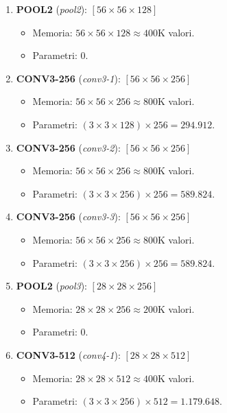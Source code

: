 ﻿\documentclass[11pt, a4paper]{article}
\begin{document}
\begin{enumerate}[noitemsep]
\begin{itemize}
    \end{itemize}
    \item \textbf{POOL2} (\emph{pool2}): $[56 \times 56 \times 128]$
    \begin{itemize}
        \item Memoria: $56 \times 56 \times 128 \approx 400\text{K}$ valori.
        \item Parametri: $0$.
    \end{itemize}
    \item \textbf{CONV3-256} (\emph{conv3-1}): $[56 \times 56 \times 256]$
    \begin{itemize}
        \item Memoria: $56 \times 56 \times 256 \approx 800\text{K}$ valori.
        \item Parametri: $(3 \times 3 \times 128) \times 256 = 294.912$.
    \end{itemize}
    \item \textbf{CONV3-256} (\emph{conv3-2}): $[56 \times 56 \times 256]$
    \begin{itemize}
        \item Memoria: $56 \times 56 \times 256 \approx 800\text{K}$ valori.
        \item Parametri: $(3 \times 3 \times 256) \times 256 = 589.824$.
    \end{itemize}
    \item \textbf{CONV3-256} (\emph{conv3-3}): $[56 \times 56 \times 256]$
    \begin{itemize}
        \item Memoria: $56 \times 56 \times 256 \approx 800\text{K}$ valori.
        \item Parametri: $(3 \times 3 \times 256) \times 256 = 589.824$.
    \end{itemize}
    \item \textbf{POOL2} (\emph{pool3}): $[28 \times 28 \times 256]$
    \begin{itemize}
        \item Memoria: $28 \times 28 \times 256 \approx 200\text{K}$ valori.
        \item Parametri: $0$.
    \end{itemize}
    \item \textbf{CONV3-512} (\emph{conv4-1}): $[28 \times 28 \times 512]$
    \begin{itemize}
        \item Memoria: $28 \times 28 \times 512 \approx 400\text{K}$ valori.
        \item Parametri: $(3 \times 3 \times 256) \times 512 = 1.179.648$.

\end{itemize}
\end{enumerate}
\end{document}
